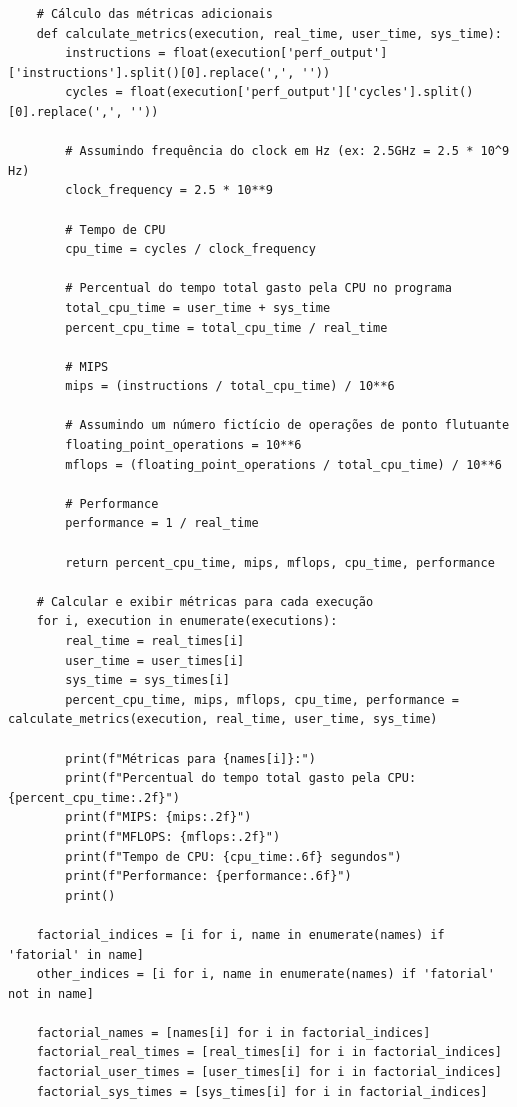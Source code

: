 \documentclass[12pt]{article}
\begin{document}
\begin{verbatim}
    # Cálculo das métricas adicionais
    def calculate_metrics(execution, real_time, user_time, sys_time):
        instructions = float(execution['perf_output']['instructions'].split()[0].replace(',', ''))
        cycles = float(execution['perf_output']['cycles'].split()[0].replace(',', ''))
        
        # Assumindo frequência do clock em Hz (ex: 2.5GHz = 2.5 * 10^9 Hz)
        clock_frequency = 2.5 * 10**9 
        
        # Tempo de CPU
        cpu_time = cycles / clock_frequency
    
        # Percentual do tempo total gasto pela CPU no programa
        total_cpu_time = user_time + sys_time
        percent_cpu_time = total_cpu_time / real_time
    
        # MIPS
        mips = (instructions / total_cpu_time) / 10**6
    
        # Assumindo um número fictício de operações de ponto flutuante
        floating_point_operations = 10**6 
        mflops = (floating_point_operations / total_cpu_time) / 10**6
    
        # Performance
        performance = 1 / real_time
    
        return percent_cpu_time, mips, mflops, cpu_time, performance
    
    # Calcular e exibir métricas para cada execução
    for i, execution in enumerate(executions):
        real_time = real_times[i]
        user_time = user_times[i]
        sys_time = sys_times[i]
        percent_cpu_time, mips, mflops, cpu_time, performance = calculate_metrics(execution, real_time, user_time, sys_time)
    
        print(f"Métricas para {names[i]}:")
        print(f"Percentual do tempo total gasto pela CPU: {percent_cpu_time:.2f}")
        print(f"MIPS: {mips:.2f}")
        print(f"MFLOPS: {mflops:.2f}")
        print(f"Tempo de CPU: {cpu_time:.6f} segundos")
        print(f"Performance: {performance:.6f}")
        print()
    
    factorial_indices = [i for i, name in enumerate(names) if 'fatorial' in name]
    other_indices = [i for i, name in enumerate(names) if 'fatorial' not in name]
    
    factorial_names = [names[i] for i in factorial_indices]
    factorial_real_times = [real_times[i] for i in factorial_indices]
    factorial_user_times = [user_times[i] for i in factorial_indices]
    factorial_sys_times = [sys_times[i] for i in factorial_indices]
    

\end{verbatim}
\end{document}
